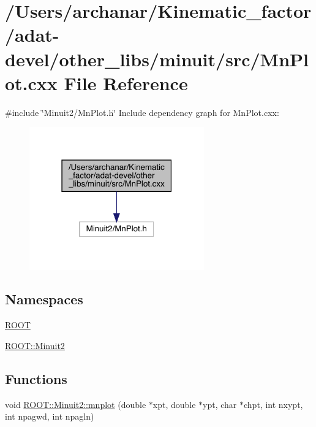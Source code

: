 \hypertarget{adat-devel_2other__libs_2minuit_2src_2MnPlot_8cxx}{}\section{/\+Users/archanar/\+Kinematic\+\_\+factor/adat-\/devel/other\+\_\+libs/minuit/src/\+Mn\+Plot.cxx File Reference}
\label{adat-devel_2other__libs_2minuit_2src_2MnPlot_8cxx}
{\ttfamily \#include \char`\"{}Minuit2/\+Mn\+Plot.\+h\char`\"{}}\newline
Include dependency graph for Mn\+Plot.\+cxx\+:
\nopagebreak
\begin{figure}[H]
\begin{center}
\leavevmode
\includegraphics[width=214pt]{dc/d24/adat-devel_2other__libs_2minuit_2src_2MnPlot_8cxx__incl}
\end{center}
\end{figure}
\subsection*{Namespaces}
\begin{DoxyCompactItemize}
\item 
 \mbox{\hyperlink{namespaceROOT}{R\+O\+OT}}
\item 
 \mbox{\hyperlink{namespaceROOT_1_1Minuit2}{R\+O\+O\+T\+::\+Minuit2}}
\end{DoxyCompactItemize}
\subsection*{Functions}
\begin{DoxyCompactItemize}
\item 
void \mbox{\hyperlink{namespaceROOT_1_1Minuit2_a2c786d8330736525f0757ba1848f5bc4}{R\+O\+O\+T\+::\+Minuit2\+::mnplot}} (double $\ast$xpt, double $\ast$ypt, char $\ast$chpt, int nxypt, int npagwd, int npagln)
\end{DoxyCompactItemize}
